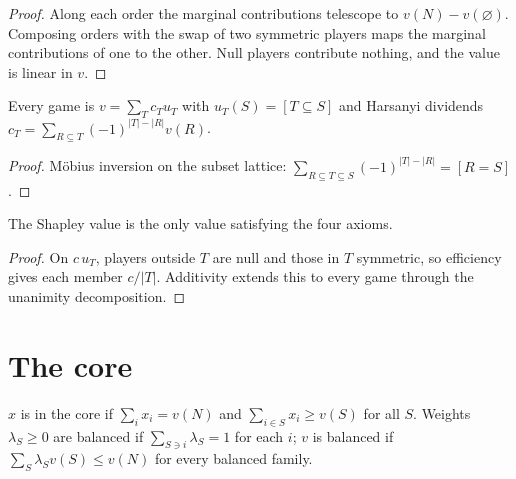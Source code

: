 \begin{theorem}
\label{thm:shapley-axioms}
\leanok
{}
\end{theorem}
\begin{proof}
\leanok
Along each order the marginal contributions telescope to $v(N) - v(\varnothing)$. Composing orders with the swap of
two symmetric players maps the marginal contributions of one to the other. Null players contribute nothing, and the
value is linear in $v$.
\end{proof}

\begin{lemma}
\label{lem:unanimity}
\leanok
{}
Every game is $v = \sum_T c_T u_T$ with $u_T(S) = [T \subseteq S]$ and Harsanyi dividends
$c_T = \sum_{R \subseteq T} (-1)^{|T| - |R|} v(R)$.
\end{lemma}
\begin{proof}
\leanok
Möbius inversion on the subset lattice: $\sum_{R \subseteq T \subseteq S} (-1)^{|T| - |R|} = [R = S]$.
\end{proof}

\begin{theorem}
\label{thm:shapley-unique}
\leanok
{}
The Shapley value is the only value satisfying the four axioms.
\end{theorem}
\begin{proof}
\leanok
On $c\,u_T$, players outside $T$ are null and those in $T$ symmetric, so efficiency gives each member $c/|T|$.
Additivity extends this to every game through the unanimity decomposition.
\end{proof}

\section{The core}

\begin{definition}
\label{def:core}
\leanok
{}
$x$ is in the core if $\sum_i x_i = v(N)$ and $\sum_{i \in S} x_i \ge v(S)$ for all $S$. Weights $\lambda_S \ge 0$
are balanced if $\sum_{S \ni i} \lambda_S = 1$ for each $i$; $v$ is balanced if $\sum_S \lambda_S v(S) \le v(N)$
for every balanced family.
\end{definition}

